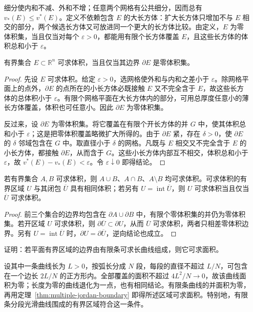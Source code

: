 \documentclass[UTF8,12pt,a4paper,fontset=fandol]{ctexbook}
\begin{document}
细分使内和不减、外和不增；任意两个网格有公共细分，因而总有 $v_*(E)\leq v^*(E)$。定义不依赖包含 $E$ 的大长方体：扩大长方体只增加不与 $E$ 相交的部分，两个候选长方体又可放进同一个更大的长方体比较。由定义，$E$ 为零体积集，当且仅当对每个 $\varepsilon>0$，都能用有限个长方体覆盖 $E$，且这些长方体的体积总和小于 $\varepsilon$。

\begin{theorem}
\label{thm:multiple-jordan-boundary}
有界集合 $E\subset\mathbb R^n$ 可求体积，当且仅当其边界 $\partial E$ 是零体积集。
\end{theorem}
\begin{proof}
先设 $E$ 可求体积。给定 $\varepsilon>0$，选网格使外和与内和之差小于 $\varepsilon$。除网格平面上的点外，$\partial E$ 的点所在的小长方体必既接触 $E$ 又不完全含于 $E$，故这些长方体的总体积小于 $\varepsilon$。有限个网格平面在大长方体内的部分，可用总厚度任意小的薄长方体覆盖，体积也可任意小。因此 $\partial E$ 为零体积集。

反过来，设 $\partial E$ 为零体积集。将它覆盖在有限个开长方体的并 $G$ 中，使其体积总和小于 $\varepsilon$；这是把零体积覆盖略微扩大所得的。由于 $\partial E$ 紧，存在 $\delta>0$，使 $\partial E$ 的 $\delta$ 邻域包含在 $G$ 中。取直径小于 $\delta$ 的网格。凡既与 $E$ 相交又不完全含于 $E$ 的小长方体，都接触 $\partial E$，从而含于 $G$。这些小长方体内部互不相交，体积总和小于 $\varepsilon$，故 $v^*(E)-v_*(E)<\varepsilon$。令 $\varepsilon\downarrow0$ 即得结论。
\end{proof}

\begin{corollary}
\label{cor:multiple-jordan-set-operations}
若有界集合 $A,B$ 可求体积，则 $A\cup B$、$A\cap B$、$A\setminus B$ 均可求体积。可求体积的有界区域 $U$ 与其闭包 $\overline U$ 具有相同体积；若另有 $U=\operatorname{int}\overline U$，则 $U$ 可求体积当且仅当 $\overline U$ 可求体积。
\end{corollary}
\begin{proof}
前三个集合的边界均包含在 $\partial A\cup\partial B$ 中，有限个零体积集的并仍为零体积集。若开区域 $U$ 可求体积，则 $\partial\overline U\subset\partial U$，从而 $\overline U$ 可求体积，两者只相差零体积边界。另有 $U=\operatorname{int}\overline U$ 时，$\partial U=\partial\overline U$，逆向结论也成立。
\end{proof}

\begin{example}
\label{ex:multiple-rectifiable-boundary}
证明：若平面有界区域的边界由有限条可求长曲线组成，则它可求面积。
\end{example}
\begin{solve}
设其中一条曲线长为 $L>0$，按弧长分成 $N$ 段，每段的直径不超过 $L/N$，可包含在一个边长 $2L/N$ 的正方形内。全部覆盖的面积不超过 $4L^2/N\to0$，故该曲线面积为零；长度为零的曲线退化为一点，也有相同结论。有限条曲线的并面积为零，再用定理~\ref{thm:multiple-jordan-boundary} 即得所述区域可求面积。特别地，有限条分段光滑曲线围成的有界区域符合这一条件。
\end{solve}
\end{document}
